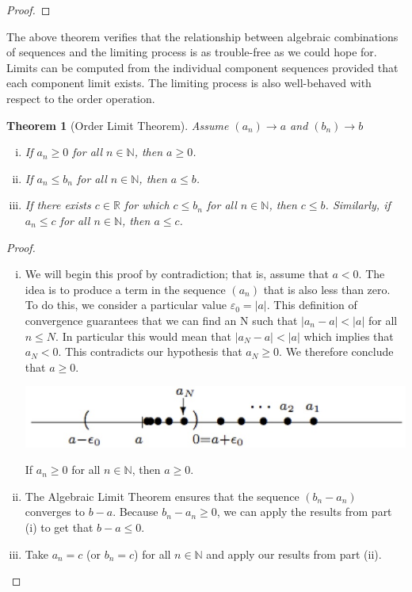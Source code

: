 \documentclass{tufte-book}
\newtheorem{theorem}{Theorem}[chapter]
\theoremstyle{definition}
\numberwithin{section}{chapter}
\begin{document}
\begin{proof}

\end{proof}

The above theorem verifies that the relationship between algebraic combinations of sequences and the limiting process is as trouble-free as we could hope for.  Limits can be computed from the individual component sequences provided that each component limit exists.  The limiting process is also well-behaved with respect to the order operation.

\begin{theorem}[Order Limit Theorem]  Assume $(a_{n}) \to a$ and $(b_{n})\to b$
\begin{enumerate}[(i)]
	\item If $a_{n} \geq 0$ for all $n \in \mathbb{N}$, then $a\geq0$.
	\item If $a_{n}\leq b_{n}$ for all $n \in \mathbb{N}$, then $a\leq b$.
	\item If there exists $c \in \mathbb{R}$ for which $c \leq b_{n}$ for all $n \in \mathbb{N}$, then $c \leq b$.  Similarly, if $a_{n} \leq c$ for all $n \in \mathbb{N}$, then $a\leq c$.
\end{enumerate}
\end{theorem}

\begin{proof}
\begin{enumerate}[(i)]
	\item We will begin this proof by contradiction; that is, assume that $a<0$.  The idea is to produce a term in the sequence $(a_{n})$ that is also less than zero.  To do this, we consider a particular value $\varepsilon_{0}=|a|$. This definition of convergence guarantees that we can find an N such that $|a_{n} - a|<|a|$ for all $n \leq N$.  In particular this would mean that $|a_{N} - a| < |a|$ which implies that $a_{N}<0$.  This contradicts our hypothesis that $a_{N} \geq 0$.  We therefore conclude that $a \geq 0$.
	
	\begin{marginfigure}
  \includegraphics{OrderLimitTH.jpg}
  \caption{If $a_{n} \geq 0$ for all $n \in \mathbb{N}$, then $a\geq0$.}
\end{marginfigure}
	\item  The Algebraic Limit Theorem ensures that the sequence $(b_{n} - a_{n})$  converges to $b-a$.  Because $b_{n} - a_{n} \geq 0$, we can apply the results from part (i) to get that $b-a \leq 0$.
	\item  Take $a_{n} = c$ (or $b_{n} = c$) for all $n \in \mathbb{N}$ and apply our results from part (ii).

\end{enumerate}
\end{proof}
\end{document}
